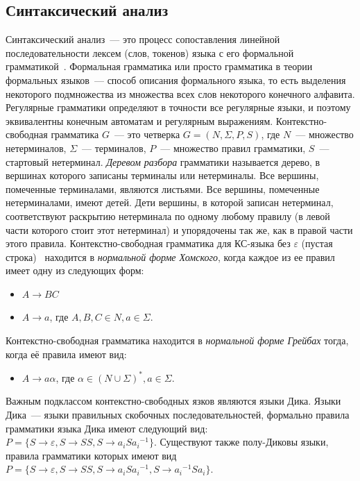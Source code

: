 \subsection{Синтаксический анализ}
Синтаксический анализ~--- это процесс сопоставления линейной последовательности лексем (слов, токенов) языка с его формальной грамматикой~\cite{UlmanCompilers}. Формальная грамматика или просто грамматика в теории формальных языков~--- способ описания формального языка, то есть выделения некоторого подмножества из множества всех слов некоторого конечного алфавита. Регулярные грамматики определяют в точности все регулярные языки, и поэтому эквивалентны конечным автоматам и регулярным выражениям. Контекстно-свободная грамматика $G$~--- это четверка $G = (N, \Sigma, P, S)$, где $N$~--- множество нетерминалов, $\Sigma$~--- терминалов, $P$~--- множество правил грамматики, $S$~--- стартовый нетерминал. \textit{Деревом разбора} грамматики называется дерево, в вершинах которого записаны терминалы или нетерминалы. Все вершины, помеченные терминалами, являются листьями. Все вершины, помеченные нетерминалами, имеют детей. Дети вершины, в которой записан нетерминал, соответствуют раскрытию нетерминала по одному любому правилу (в левой части которого стоит этот нетерминал) и упорядочены так же, как в правой части этого правила. Контекстно-свободная грамматика для КС-языка без $\varepsilon$ (пустая строка)~\cite{Hopcroft} находится в \textit{нормальной форме Хомского}, когда каждое из ее правил имеет одну из следующих форм:
\begin{itemize}
\item $A \rightarrow BC$
\item $A \rightarrow a$, где $A, B, C \in N, a \in \Sigma$.
\end{itemize}
Контекстно-свободная грамматика находится в \textit{нормальной форме Грейбах} тогда, когда её правила имеют вид:
\begin{itemize}
\item $A \rightarrow a\alpha$, где $\alpha \in {(N \cup \Sigma)}^*, a \in \Sigma$.
\end{itemize}
Важным подклассом контекстно-свободных язков являются языки Дика. Языки Дика~--- языки правильных скобочных последовательностей, формально правила грамматики языка Дика имеют следующий вид: $P = \{S \rightarrow \varepsilon, S \rightarrow SS, S \rightarrow a_i S {a_i}^{-1}\}$. Существуют также полу-Диковы языки, правила грамматики которых имеют вид $P = \{S \rightarrow \varepsilon, S \rightarrow SS, S \rightarrow a_i S {a_i}^{-1}, S \rightarrow {a_i}^{-1} S {a_i}\}$.

